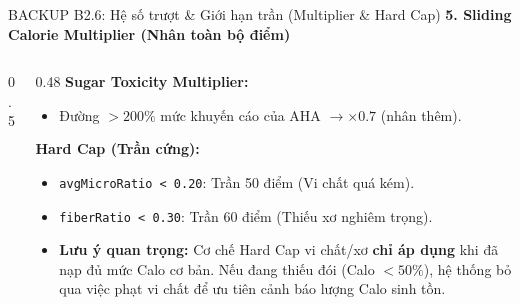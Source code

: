\documentclass[10pt, aspectratio=169]{beamer}
\begin{document}
\begin{frame}[label=b2_6]{BACKUP B2.6: Hệ số trượt \& Giới hạn trần (Multiplier \& Hard Cap)}
\hypertarget{b2_6_target}{}
    \textbf{5. Sliding Calorie Multiplier (Nhân toàn bộ điểm)}
    
    \begin{columns}[T]
        \begin{column}{0.5\textwidth}
        \end{column}
        
        \begin{column}{0.48\textwidth}
            \textbf{Sugar Toxicity Multiplier:}
            \begin{itemize}
                \small
                \item Đường $> 200\%$ mức khuyến cáo của AHA $\rightarrow \times 0.7$ (nhân thêm).
            \end{itemize}
            
            \vspace{0.2cm}
            \textbf{Hard Cap (Trần cứng):}
            \begin{itemize}
                \small
                \item \texttt{avgMicroRatio < 0.20}: Trần 50 điểm (Vi chất quá kém).
                \item \texttt{fiberRatio < 0.30}: Trần 60 điểm (Thiếu xơ nghiêm trọng).
                \item \textcolor{NutriDark}{\textbf{Lưu ý quan trọng:}} Cơ chế Hard Cap vi chất/xơ \textbf{chỉ áp dụng} khi đã nạp đủ mức Calo cơ bản. Nếu đang thiếu đói (Calo $< 50\%$), hệ thống bỏ qua việc phạt vi chất để ưu tiên cảnh báo lượng Calo sinh tồn.
            \end{itemize}
        \end{column}
    \end{columns}
\end{frame}
\end{document}
